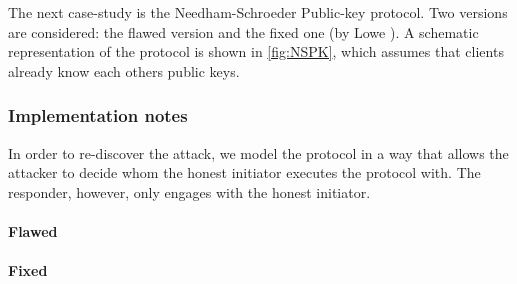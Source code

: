 The next case-study is the Needham-Schroeder Public-key protocol. Two versions are considered: the flawed version and the fixed one (by Lowe \cite{NSPK_LoweGavin}). A schematic representation of the protocol is shown in \cref{fig:NSPK}, which assumes that clients already know each others public keys.

\subsubsection{Implementation notes}

In order to re-discover the attack, we model the protocol in a way that allows the attacker to decide whom the honest initiator executes the protocol with. The responder, however, only engages with the honest initiator.

\paragraph{Flawed} 
\paragraph{Fixed}